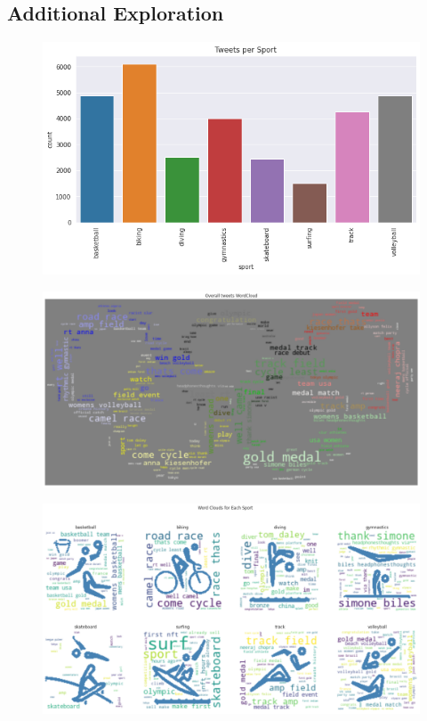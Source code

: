 \documentclass[12pt]{article}
\begin{document}
        \subsection{Additional Exploration}
        \begin{figure}[H]
            \centering
            \includegraphics[scale=0.5]{sporttweet.png}
        \end{figure}
            \begin{figure}[H]
                \centering
                \includegraphics[scale=0.4]{wordcloud.png}
            \end{figure}
            \begin{figure}[H]
                \centering
                \includegraphics[scale=0.4]{sportsclouds.png}
            \end{figure}
\end{document}
